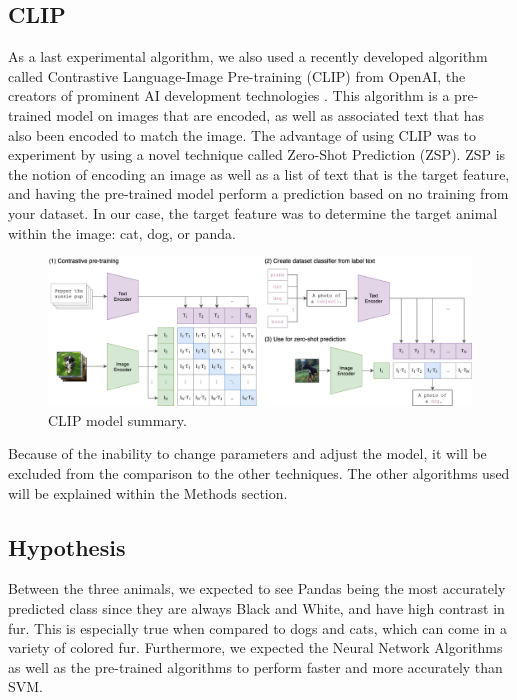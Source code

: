 \subsection{CLIP}
As a last experimental algorithm, we also used a recently developed algorithm called Contrastive Language-Image Pre-training (CLIP) from OpenAI, the creators of prominent AI development technologies \cite{CLIP}.
This algorithm is a pre-trained model on images that are encoded, as well as associated text that has also been encoded to match the image.
The advantage of using CLIP was to experiment by using a novel technique called Zero-Shot Prediction (ZSP).
ZSP is the notion of encoding an image as well as a list of text that is the target feature, and having the pre-trained model perform a prediction based on no training from your dataset.
In our case, the target feature was to determine the target animal within the image: cat, dog, or panda.

\begin{figure}[h]
	\centering
	\includegraphics[scale=0.5]{CLIP_structure}
	\caption{CLIP model summary.}
	\label{fig:figure3}
\end{figure}

Because of the inability to change parameters and adjust the model, it will be excluded from the comparison to the other techniques.
The other algorithms used will be explained within the Methods section.

\subsection{Hypothesis}
Between the three animals, we expected to see Pandas being the most accurately predicted class since they are always Black and White, and have high contrast in fur.
This is especially true when compared to dogs and cats, which can come in a variety of colored fur.
Furthermore, we expected the Neural Network Algorithms as well as the pre-trained algorithms to perform faster and more accurately than SVM.